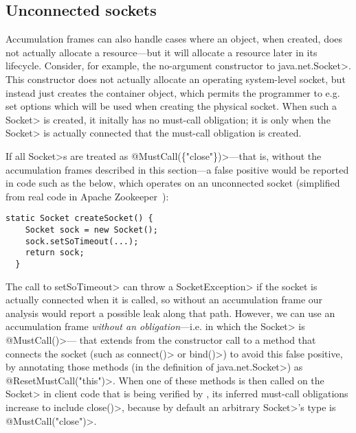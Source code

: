 \subsection{Unconnected sockets}
\label{sec:unconnected-sockets}
Accumulation frames can also handle cases where an object, when created,
does not actually allocate a resource---but it will allocate a resource
later in its lifecycle. Consider, for example, the no-argument constructor
to \<java.net.Socket>. This constructor does not actually allocate an
operating system-level socket, but instead just creates the container
object, which permits the programmer to e.g. set options which will be used
when creating the physical socket. When such a \<Socket> is created, it
initally has no must-call obligation; it is only when the \<Socket> is
actually connected that the must-call obligation is created.

If all \<Socket>s are treated as \<@MustCall(\{"close"\})>---that is,
without the accumulation frames described in this section---a false positive
would be reported
in code such as the below, which operates on an unconnected socket
(simplified from real code in Apache Zookeeper~):

\begin{lstlisting}[frame=tb,belowskip=3mm]
  static Socket createSocket() {
    Socket sock = new Socket();
    sock.setSoTimeout(...);
    return sock;
  }
\end{lstlisting}

The call to \<setSoTimeout> can throw a \<SocketException> if the
socket is actually connected when it is called, so without an
accumulation frame our analysis would report a possible leak along
that path.  However, we can use an accumulation frame \emph{without an
  obligation}---i.e. in which the \<Socket> is \<@MustCall({})>---
that extends from the constructor call to a method that connects the
socket (such as \<connect()> or \<bind()>) to avoid this false
positive, by annotating those methods (in the definition of
\<java.net.Socket>) as \<@ResetMustCall("this")>.  When one of these
methods is then called on the \<Socket> in client code that is being
verified by \tool, its inferred must-call obligations increase to include
\<close()>, because by default an arbitrary \<Socket>'s type is
\<@MustCall("close")>.
